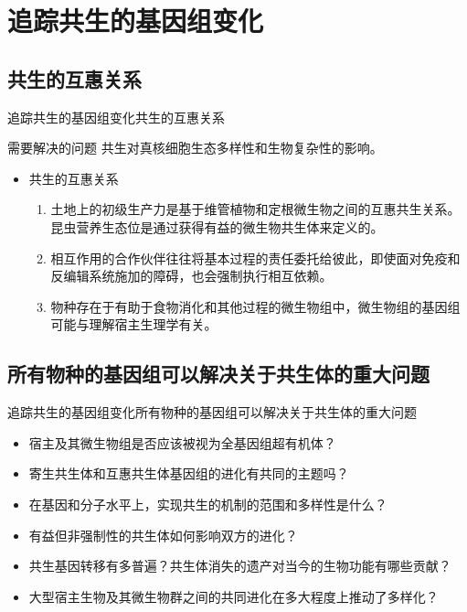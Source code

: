\documentclass{beamer}
\begin{document}
	
	\section{追踪共生的基因组变化}
	\subsection*{共生的互惠关系}
	\begin{frame}{追踪共生的基因组变化}{共生的互惠关系}
		\begin{alertblock}{需要解决的问题}
			共生对真核细胞生态多样性和生物复杂性的影响。
		\end{alertblock}
		\begin{itemize}
			\item 共生的互惠关系
			\begin{enumerate}
				\item 土地上的初级生产力是基于维管植物和定根微生物之间的互惠共生关系。昆虫营养生态位是通过获得有益的微生物共生体来定义的。
				\item 相互作用的合作伙伴往往将基本过程的责任委托给彼此，即使面对免疫和反编辑系统施加的障碍，也会强制执行相互依赖。
				\item 物种存在于有助于食物消化和其他过程的微生物组中，微生物组的基因组可能与理解宿主生理学有关。
			\end{enumerate}
		\end{itemize}
	\end{frame}


	\subsection*{所有物种的基因组可以解决关于共生体的重大问题}
	\begin{frame}{追踪共生的基因组变化}{所有物种的基因组可以解决关于共生体的重大问题}
		\begin{itemize}
			\item 宿主及其微生物组是否应该被视为全基因组超有机体？
			\item 寄生共生体和互惠共生体基因组的进化有共同的主题吗？
			\item 在基因和分子水平上，实现共生的机制的范围和多样性是什么？
			\item 有益但非强制性的共生体如何影响双方的进化？
			\item 共生基因转移有多普遍？共生体消失的遗产对当今的生物功能有哪些贡献？
			\item 大型宿主生物及其微生物群之间的共同进化在多大程度上推动了多样化？
			
		\end{itemize}
	\end{frame}
\end{document}

